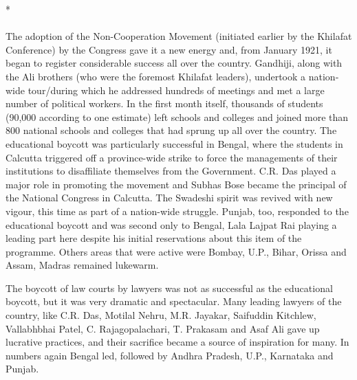 \begin{center}*\end{center}

\paragraph*{}


The adoption of the Non-Cooperation Movement (initiated earlier by the Khilafat Conference) by the Congress gave it a new energy and, from January 1921, it began to register considerable success all over the country. Gandhiji, along with the Ali brothers (who were the foremost Khilafat leaders), undertook a nation­ wide tour/during which he addressed hundreds of meetings and met a large number of political workers. In the first month itself, thousands of students (90,000 according to one estimate) left schools and colleges and joined more than 800 national schools and colleges that had sprung up all over the country. The educational boycott was particularly successful in Bengal, where the students in Calcutta triggered off a province-wide strike to force the managements of their institutions to disaffiliate themselves from the Government. C.R. Das played a major role in promoting the movement and Subhas Bose became the principal of the National Congress in Calcutta. The Swadeshi spirit was revived with new vigour, this time as part of a nation-wide struggle. Punjab, too, responded to the educational boycott and was second only to Bengal, Lala Lajpat Rai playing a leading part here despite his initial reservations about this item of the programme. Others areas that were active were Bombay, U.P., Bihar, Orissa and Assam, Madras remained lukewarm. 

The boycott of law courts by lawyers was not as successful as the educational boycott, but it was very dramatic and spectacular. Many leading lawyers of the country, like C.R. Das, Motilal Nehru, M.R. Jayakar, Saifuddin Kitchlew, Vallabhbhai Patel, C. Rajagopalachari, T. Prakasam and Asaf Ali gave up lucrative practices, and their sacrifice became a source of inspiration for many. In numbers again Bengal led, followed by Andhra Pradesh, U.P., Karnataka and Punjab. 

